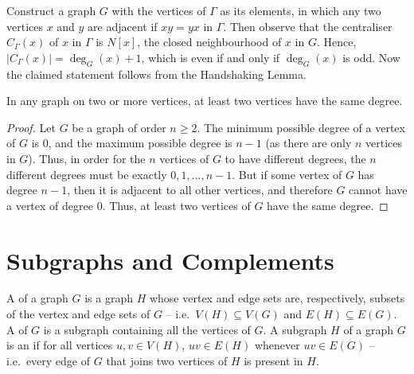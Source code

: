 \begin{Solution*}
Construct a graph $G$ with the vertices of $\Gamma$ as its elements, in which any two vertices $x$ and $y$ are adjacent if $xy = yx$ in $\Gamma$. Then observe that the centraliser $C_\Gamma(x)$ of $x$ in $\Gamma$ is $N[x]$, the closed neighbourhood of $x$ in $G$. Hence, $|C_\Gamma(x)| = \deg_G(x) + 1$, which is even if and only if $\deg_G(x)$ is odd. Now the claimed statement follows from the Handshaking Lemma.
\end{Solution*}

\begin{Theorem}
In any graph on two or more vertices, at least two vertices have the same degree.
\end{Theorem}

\begin{proof}
Let $G$ be a graph of order $n \ge 2$. The minimum possible degree of a vertex of $G$ is $0$, and the maximum possible degree is $n - 1$ (as there are only $n$ vertices in $G$). Thus, in order for the $n$ vertices of $G$ to have different degrees, the $n$ different degrees must be exactly $0, 1, \ldots, n - 1$. But if some vertex of $G$ has degree $n - 1$, then it is adjacent to all other vertices, and therefore $G$ cannot have a vertex of degree $0$. Thus, at least two vertices of $G$ have the same degree.
\end{proof}


\section{Subgraphs and Complements}\label{sec:Subgraphs}

A  of a graph $G$ is a graph $H$ whose vertex and edge sets are, respectively, subsets of the vertex and edge sets of $G$ -- i.e.\ $V(H) \subseteq V(G)$ and $E(H) \subseteq E(G)$. A  of $G$ is a subgraph containing all the vertices of $G$. A subgraph $H$ of a graph $G$ is an  if for all vertices $u, v \in V(H)$, $uv \in E(H)$ whenever $uv \in E(G)$ -- i.e.\ every edge of $G$ that joins two vertices of $H$ is present in $H$.

